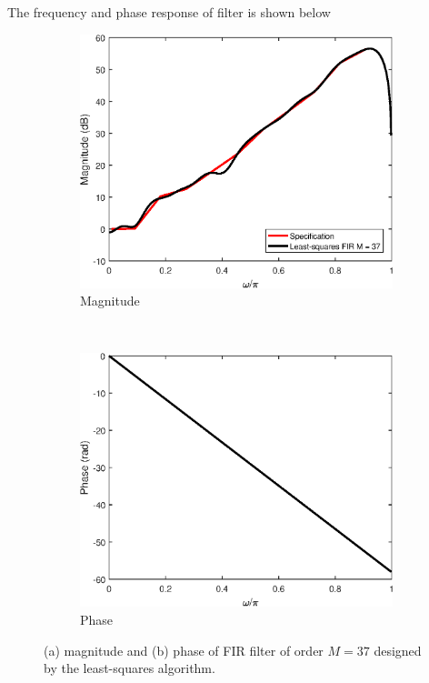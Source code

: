 \documentclass[10pt]{article}
\begin{document}
\begin{description}
{	The frequency and phase response of filter is shown below
	\FloatBarrier
	\begin{figure}
		\centering
		\begin{subfigure}[h!]{0.5\textwidth}
			\includegraphics[scale=0.55]{figs/hearing_aid_filter_mag.eps}
			\caption{Magnitude}
		\end{subfigure}~\begin{subfigure}[h!]{0.5\textwidth}
			\includegraphics[scale=0.55]{figs/hearing_aid_filter_phase.eps}
			\caption{Phase}
		\end{subfigure}
		\caption{(a) magnitude and (b) phase of FIR filter of order $M = 37$ designed by the least-squares algorithm.}
	\end{figure}
	\FloatBarrier	
	}
	\fi
	

\end{description}
\end{document}
